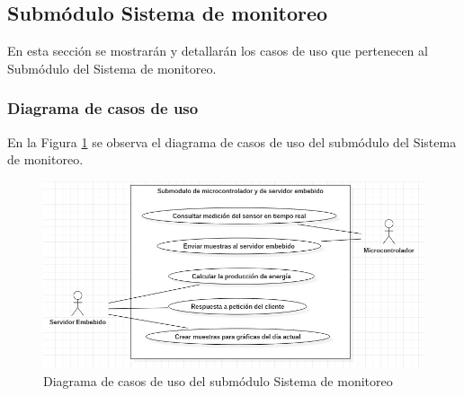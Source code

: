 \subsection{Submódulo Sistema de monitoreo}
En esta sección se mostrarán y detallarán los casos de uso que pertenecen al Submódulo del Sistema de monitoreo.
\subsubsection{Diagrama de casos de uso}
En la Figura \ref{fig:dcu-moduloMonitoreo} se observa el diagrama de casos de uso del submódulo del Sistema de monitoreo.
\begin{figure}[H]
	\centering
	\includegraphics[scale=.6]{Capitulo4/software/submodulos/images/dcuservidor.jpeg}
	\caption{Diagrama de casos de uso del submódulo Sistema de monitoreo}
	\label{fig:dcu-moduloMonitoreo}
\end{figure}





